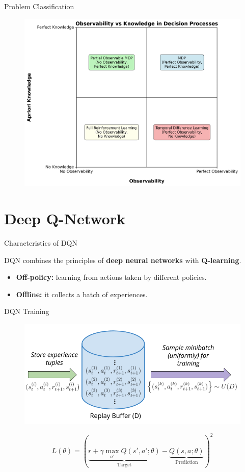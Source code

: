 \documentclass[serif]{beamer}  %
\begin{document}
    \begin{frame}{Problem Classification}
        \begin{figure}
            \centering
            \includegraphics[width=0.8\linewidth]{images/knowledge_vs_observability.png}
        \end{figure}
    \end{frame}

\section{Deep Q-Network}

\begin{frame}{Characteristics of DQN}

    DQN combines the principles of \textbf{deep neural networks} with \textbf{Q-learning}.
    \vspace{1cm}
    \begin{itemize}
        \item \textbf{Off-policy:} learning from actions taken by different policies.
        \vspace{0.5cm}
        \item \textbf{Offline:} it collects a batch of experiences.
    \end{itemize}
\end{frame}

\begin{frame}{DQN Training}
    \begin{figure}
        \centering
        \includegraphics[width=0.8\linewidth]{images/experience_replay_buffer.png}
    \end{figure}
    \[L(\theta) = \left( \underbrace{r + \gamma \max_{a'} Q(s', a'; \theta)}_{\text{Target}} - \underbrace{Q(s, a; \theta)}_{\text{Prediction}} \right)^2\]
\end{frame}
\end{document}
